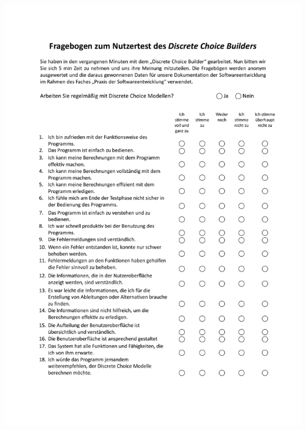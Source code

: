 \documentclass{article}
\begin{document}
\includegraphics[page = 2, width=1\textwidth,height=1\textheight]{ressources/NutzertestsFragebogen.pdf}
\newpage
\clearpage
\printunsrtglossary
\end{document}
